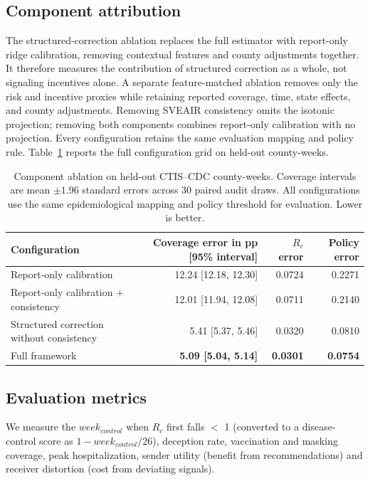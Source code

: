 \documentclass[sigconf,review]{acmart}
\begin{document}
\subsection{Component attribution} 
The structured-correction ablation replaces the full estimator with report-only ridge calibration, removing contextual features and county adjustments together. It therefore measures the contribution of structured correction as a whole, not signaling incentives alone. A separate feature-matched ablation removes only the risk and incentive proxies while retaining reported coverage, time, state effects, and county adjustments. Removing SVEAIR consistency omits the isotonic projection; removing both components combines report-only calibration with no projection. Every configuration retains the same evaluation mapping and policy rule. Table~\ref{tab:full-component-ablation} reports the full configuration grid on held-out county-weeks.

\begin{table}[tp]
\centering
\caption{Component ablation on held-out CTIS--CDC county-weeks.
Coverage intervals are mean $\pm1.96$ standard errors across
30 paired audit draws. All configurations use the same
epidemiological mapping and policy threshold for evaluation.
Lower is better.}
\label{tab:full-component-ablation}
\small
\setlength{\tabcolsep}{6pt}
\begin{tabular}{@{}lrrr@{}}
\toprule
Configuration
& Coverage error in pp [95\% interval]
& $R_c$ error
& Policy error \\
\midrule
Report-only calibration
& 12.24 [12.18, 12.30] & 0.0724 & 0.2271 \\
Report-only calibration + consistency
& 12.01 [11.94, 12.08] & 0.0711 & 0.2140 \\
Structured correction without consistency
& 5.41 [5.37, 5.46] & 0.0320 & 0.0810 \\
Full framework
& \textbf{5.09 [5.04, 5.14]}
& \textbf{0.0301}
& \textbf{0.0754} \\
\bottomrule
\end{tabular}
\end{table}

\subsection{Evaluation metrics} We measure the $week_{control}$  when $R_c$ first falls $<$ 1 (converted to a disease-control score as $1-week_{control}/26$), deception rate, vaccination and masking coverage, peak hospitalization, sender utility (benefit from recommendations) and receiver distortion (cost from deviating signals). 
\end{document}
